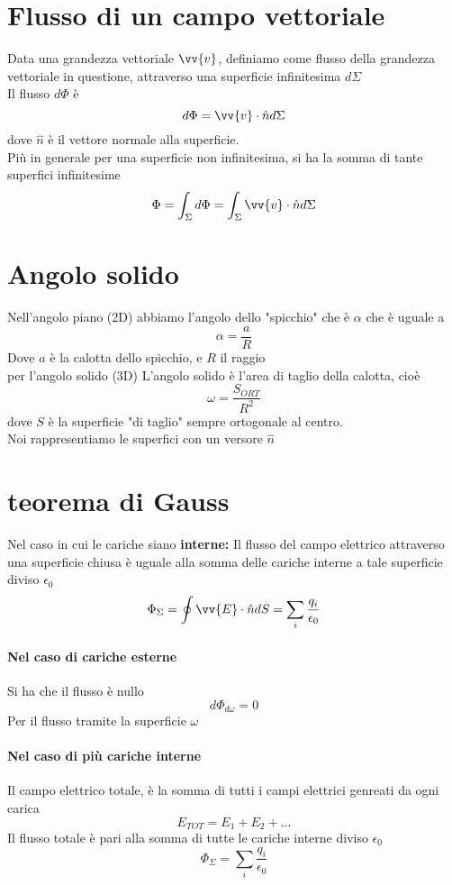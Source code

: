 \documentclass[a4paper]{report}
\begin{document}
  \section{Flusso di un campo vettoriale}
  Data una grandezza vettoriale $\vv{v}$,  definiamo come flusso della grandezza vettoriale in questione, attraverso una superficie infinitesima $d \Sigma$\\
  Il flusso $d \Phi$ è
  $$ d \Phi = \vv{v}\cdot \hat{n} d \Sigma $$
  dove $\hat{n}$ è il vettore normale alla superficie.\\
  Più in generale per una superficie non infinitesima, si ha la somma di tante superfici infinitesime
  $$ \Phi = \int_\Sigma d\Phi = \int_\Sigma \vv{v} \cdot \hat{n} d\Sigma $$


  \section{Angolo solido}
  Nell'angolo piano (2D) abbiamo l'angolo dello "spicchio" che è $\alpha$ che è uguale a
  $$\alpha = \frac{a}{R}$$
  Dove $a$ è la calotta dello spicchio, e $R$ il raggio\\
  per l'angolo solido (3D)
  L'angolo solido è l'area di taglio della calotta, cioè
  $$ \omega = \frac{S_{ORT}}{R^2} $$
  dove $S$ è la superficie "di taglio" sempre ortogonale al centro.\\
  Noi rappresentiamo le superfici con un versore $\hat{n}$


  \section{teorema di Gauss}
  Nel caso in cui le cariche siano \textbf{interne:}
  Il flusso del campo elettrico attraverso una superficie chiusa è uguale alla somma delle cariche interne a tale superficie diviso $\epsilon_0$
  $$ \Phi_{\Sigma} = \oint \vv{E} \cdot \hat{n} dS = \sum_i \frac{q_i}{\epsilon_0} $$
  \paragraph{Nel caso di cariche esterne}
  Si ha che il flusso è nullo
  $$ d\Phi_{d\omega} = 0$$
  Per il flusso tramite la superficie $\omega$
  \paragraph{Nel caso di più cariche interne}
  Il campo elettrico totale, è la somma di tutti i campi elettrici genreati da ogni carica
  $$E_{TOT} = E_1 + E_2 + ...$$
  Il flusso totale è pari alla somma di tutte le cariche interne diviso $\epsilon_0$
  $$ \Phi_{\Sigma} = \sum_i \frac{q_i}{\epsilon_0} $$
\end{document}
